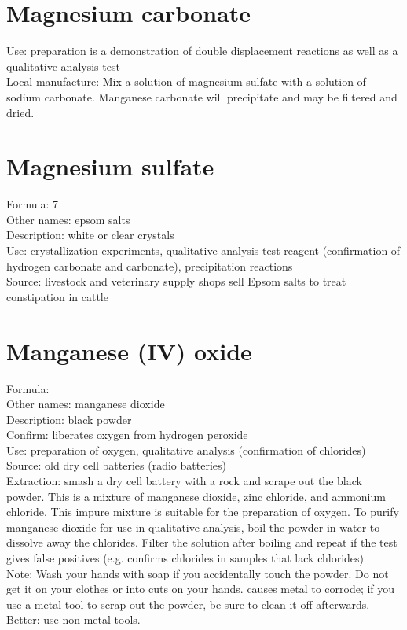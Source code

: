 \section{Magnesium carbonate}
Use: preparation is a demonstration of double displacement reactions 
as well as a qualitative analysis test\\
Local manufacture: Mix a solution of magnesium sulfate 
with a solution of sodium carbonate. 
Manganese carbonate will precipitate and may be filtered and dried.

\section{Magnesium sulfate}
\label{sec:magsulfate}
Formula:  7\\
Other names: epsom salts\\
Description: white or clear crystals\\
Use: crystallization experiments, 
qualitative analysis test reagent 
(confirmation of hydrogen carbonate and carbonate), 
precipitation reactions\\
Source: livestock and veterinary supply shops sell Epsom salts 
to treat constipation in cattle

\section{Manganese (IV) oxide}
Formula: \\
Other names: manganese dioxide\\
Description: black powder\\
Confirm: liberates oxygen from hydrogen peroxide\\
Use: preparation of oxygen, 
qualitative analysis (confirmation of chlorides)\\
Source: old dry cell batteries (radio batteries)\\
Extraction: smash a dry cell battery with a rock 
and scrape out the black powder. 
This is a mixture of manganese dioxide, 
zinc chloride, 
and ammonium chloride. 
This impure mixture is suitable for the preparation of oxygen. 
To purify manganese dioxide for use in qualitative analysis, 
boil the powder in water to dissolve away the chlorides. 
Filter the solution after boiling 
and repeat if the test gives false positives (e.g. 
confirms chlorides in samples that lack chlorides)\\
Note: Wash your hands with soap if you accidentally touch the powder. 
Do not get it on your clothes or into cuts on your hands. 
 causes metal to corrode; 
if you use a metal tool to scrap out the powder, 
be sure to clean it off afterwards. 
Better: use non-metal tools. 

